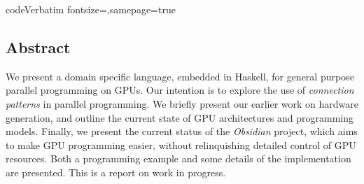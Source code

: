 





   \DefineVerbatimEnvironment
     {code}{Verbatim}
     {fontsize=\small,samepage=true}
%


       



\subsection*{Abstract}

We present a domain specific language, embedded in Haskell, for general
purpose parallel programming on GPUs. Our intention is to explore the use of
{\em connection patterns} in parallel programming. We briefly present our
earlier work on hardware generation, and outline the current state of GPU
architectures and programming models. Finally, we present the current status
of the {\em Obsidian} project, which aims to make GPU programming easier,
without relinquishing detailed control of GPU resources. Both a programming
example and some details of the implementation are presented. This is a
report on work in progress.








%
%

%
